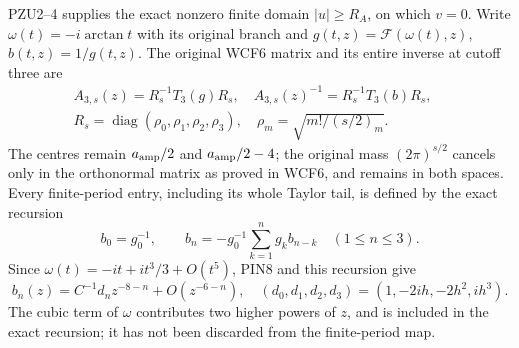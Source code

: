 PZU2--4 supplies the exact nonzero finite domain $|u|\ge R_A$,
on which $v=0$. Write $\omega(t)=-i\arctan t$ with its original
branch and
$g(t,z)=\mathcal F(\omega(t),z)$, $b(t,z)=1/g(t,z)$.
The original WCF6 matrix and its entire inverse at cutoff three are
\[
 \begin{gathered}
 A_{3,s}(z)=R_s^{-1}T_3(g)R_s,\quad
 A_{3,s}(z)^{-1}=R_s^{-1}T_3(b)R_s,\quad
 \\
 R_s=\operatorname{diag}(\rho_0,\rho_1,\rho_2,\rho_3),\quad
 \rho_m=\sqrt{m!/(s/2)_m}.
 \end{gathered}
 \tag{PIN9}
\]
The centres remain $a_{\rm amp}/2$ and $a_{\rm amp}/2-4$;
the original mass $(2\pi)^{s/2}$ cancels only in the orthonormal
matrix as proved in WCF6, and remains in both spaces.
Every finite-period entry, including its whole Taylor tail, is
defined by the exact recursion
\[
 b_0=g_0^{-1},\qquad
 b_n=-g_0^{-1}\sum_{k=1}^n g_kb_{n-k}\quad(1\le n\le3).
 \tag{PIN10}
\]
Since $\omega(t)=-it+it^3/3+O(t^5)$, PIN8 and this recursion give
\[
 b_n(z)=C^{-1}d_nz^{-8-n}+O(z^{-6-n}),\quad
 (d_0,d_1,d_2,d_3)=(1,-2ih,-2h^2,ih^3).
 \tag{PIN11}
\]
The cubic term of $\omega$ contributes two higher powers of $z$,
and is included in the exact recursion; it has not been discarded
from the finite-period map.

